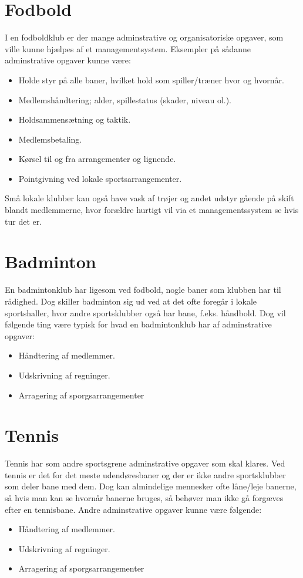 \section{Fodbold}
I en fodboldklub er der mange adminstrative og organisatoriske opgaver, som ville kunne hjælpes af et managementsystem. Eksempler på sådanne adminstrative opgaver kunne være:
\begin{itemize}
\item Holde styr på alle baner, hvilket hold som spiller/træner hvor og hvornår.
\item Medlemshåndtering; alder, spillestatus (skader, niveau ol.).
\item Holdsammensætning og taktik.
\item Medlemsbetaling.
\item Kørsel til og fra arrangementer og lignende.
\item Pointgivning ved lokale sportsarrangementer.
\end{itemize}
Små lokale klubber kan også have vask af trøjer og andet udstyr gående på skift blandt medlemmerne, hvor forældre hurtigt vil via et managementssystem se hvis tur det er. 

\section{Badminton}
En badmintonklub har ligesom ved fodbold, nogle baner som klubben har til rådighed. Dog skiller badminton sig ud ved at det ofte foregår i lokale sportshaller, hvor andre sportsklubber også har bane, f.eks. håndbold. Dog vil følgende ting være typisk for hvad en badmintonklub har af adminstrative opgaver:
\begin{itemize}
\item Håndtering af medlemmer.
\item Udskrivning af regninger.
\item Arragering af sporgsarrangementer
\end{itemize}

\section{Tennis}
Tennis har som andre sportsgrene adminstrative opgaver som skal klares. Ved tennis er det for det meste udendøresbaner og der er ikke andre sportsklubber som deler bane med dem. Dog kan almindelige mennesker ofte låne/leje banerne, så hvis man kan se hvornår banerne bruges, så behøver man ikke gå forgæves efter en tennisbane.
Andre adminstrative opgaver kunne være følgende:
\begin{itemize}
\item Håndtering af medlemmer.
\item Udskrivning af regninger.
\item Arragering af sporgsarrangementer
\end{itemize}

